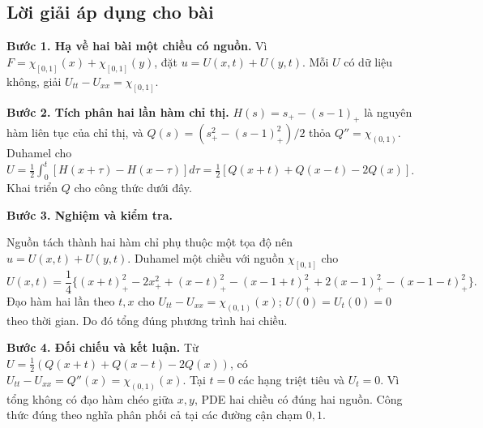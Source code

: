 \documentclass[10pt,a4paper]{article}
\begin{document}
\subsection*{Lời giải áp dụng cho bài}
\textbf{Bước 1. Hạ về hai bài một chiều có nguồn.} Vì $F=\chi_{[0,1]}(x)+\chi_{[0,1]}(y)$, đặt $u=U(x,t)+U(y,t)$. Mỗi $U$ có dữ liệu không, giải $U_{tt}-U_{xx}=\chi_{[0,1]}$.

\textbf{Bước 2. Tích phân hai lần hàm chỉ thị.} $H(s)=s_+-(s-1)_+$ là nguyên hàm liên tục của chỉ thị, và $Q(s)=(s_+^2-(s-1)_+^2)/2$ thỏa $Q''=\chi_{(0,1)}$. Duhamel cho $U=\frac12\int_0^t[H(x+\tau)-H(x-\tau)]d\tau=\frac12[Q(x+t)+Q(x-t)-2Q(x)]$. Khai triển $Q$ cho công thức dưới đây.

\textbf{Bước 3. Nghiệm và kiểm tra.}

Nguồn tách thành hai hàm chỉ phụ thuộc một tọa độ nên $u=U(x,t)+U(y,t)$. Duhamel một chiều với nguồn $\chi_{[0,1]}$ cho
\[U(x,t)=\frac14\{(x+t)_+^2-2x_+^2+(x-t)_+^2-(x-1+t)_+^2+2(x-1)_+^2-(x-1-t)_+^2\}.\]
Đạo hàm hai lần theo $t,x$ cho $U_{tt}-U_{xx}=\chi_{(0,1)}(x)$; $U(0)=U_t(0)=0$ theo thời gian. Do đó tổng đúng phương trình hai chiều.

\textbf{Bước 4. Đối chiếu và kết luận.} Từ $U=\frac12(Q(x+t)+Q(x-t)-2Q(x))$, có $U_{tt}-U_{xx}=Q''(x)=\chi_{(0,1)}(x)$. Tại $t=0$ các hạng triệt tiêu và $U_t=0$. Vì tổng không có đạo hàm chéo giữa $x,y$, PDE hai chiều có đúng hai nguồn. Công thức đúng theo nghĩa phân phối cả tại các đường cận chạm $0,1$.
\end{document}
